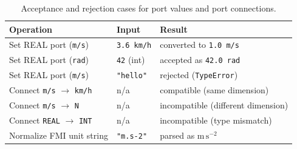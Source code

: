 \begin{table}[htbp]
  \centering
  \small
  \caption[Port verification cases]{Acceptance and rejection cases for port values and port connections.}  \label{tab:port_verification}
  \begin{tabular}{lll}
    \toprule
    \textbf{Operation}                       & \textbf{Input}     & \textbf{Result}                     \\
    \midrule
    Set REAL port (\texttt{m/s})             & \texttt{3.6\,km/h} & converted to \texttt{1.0\,m/s}      \\
    Set REAL port (\texttt{rad})             & \texttt{42} (int)  & accepted as \texttt{42.0\,rad}      \\
    Set REAL port (\texttt{m/s})             & \texttt{"hello"}   & rejected (\texttt{TypeError})       \\
    Connect \texttt{m/s} $\to$ \texttt{km/h} & n/a                & compatible (same dimension)         \\
    Connect \texttt{m/s} $\to$ \texttt{N}    & n/a                & incompatible (different dimension)  \\
    Connect \texttt{REAL} $\to$ \texttt{INT} & n/a                & incompatible (type mismatch)        \\
    Normalize \ac{FMI} unit string           & \texttt{"m.s-2"}   & parsed as $\text{m}\,\text{s}^{-2}$ \\
    \bottomrule
  \end{tabular}
\end{table}
